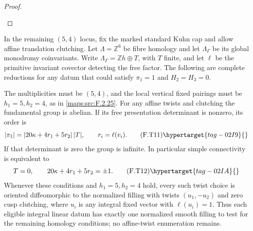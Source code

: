 \begin{proof}
\begin{enumerate}[label={$\langle1\rangle$\arabic*.}]
\end{enumerate}
\end{proof}




\begin{theorem}\hypertarget{tag-02NI}{}\label{maps:src:F.2.28}


In the remaining $(5,4)$ locus, fix the marked standard Kuhn
cap and allow affine translation clutching.
Let $\Lambda=\mathbb Z^6$ be fibre homology and let
$\Lambda_\Gamma$ be its global monodromy coinvariants.
Write $\Lambda_\Gamma=\mathbb Zh\oplus T$, with $T$ finite,
and let $\ell$ be the primitive invariant covector detecting
the free factor.  The following are complete reductions for
any datum that could satisfy $\pi_1=1$ and $H_2=H_3=0$.

The multiplicities must be $(5,4)$, and the local
vertical fixed pairings must be $h_1=5,h_2=4$, as in \ref{maps:src:F.2.25}.
For any affine twists and clutching the fundamental group
is abelian.  If its free presentation determinant is nonzero,
its order is
\[
 |\pi_1|=|20\kappa+4r_1+5r_2|\,|T|,
 \qquad r_i=\ell(v_i).
 \tag{F.T11}\hypertarget{tag-02I9}{}\label{maps:eq:F.T11}
\]
If that determinant is zero the group is infinite.
In particular simple connectivity is equivalent to
\[
 T=0,\qquad 20\kappa+4r_1+5r_2=\pm1.
 \tag{F.T12}\hypertarget{tag-02IA}{}\label{maps:eq:F.T12}
\]
Whenever these conditions and $h_1=5,h_2=4$ hold, every
such twist choice is oriented diffeomorphic to the normalized
filling with twists $(u_1,-u_2)$ and zero cusp clutching,
where $u_i$ is any integral fixed vector with $\ell(u_i)=1$.
Thus each eligible integral linear datum has exactly one
normalized smooth filling to test for the remaining
homology conditions; no affine-twist enumeration remains.

\end{theorem}


